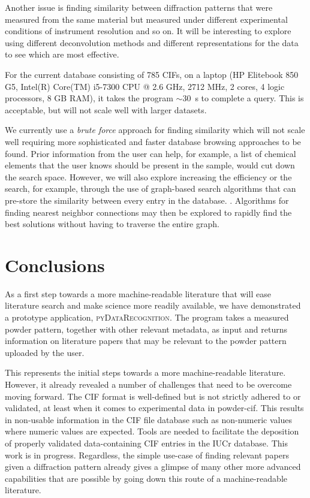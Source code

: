 \documentclass[preprint]{iucr}
\newcommand{\pydr}{\textsc{pyDataRecognition}\xspace}
\begin{document}
Another issue is finding similarity between diffraction patterns that were measured from the same material but measured under different experimental conditions of instrument resolution and so on.  It will be interesting to explore using different deconvolution methods and different representations for the data to see which are most effective.

For the current database consisting of 785 CIFs, on a laptop (HP Elitebook 850 G5, Intel(R) Core(TM) i5-7300 CPU @ 2.6 GHz, 2712 MHz, 2 cores, 4 logic processors, 8 GB RAM), it takes the program $\sim30$~s to complete a query.  This is acceptable, but will not scale well with larger datasets.

We currently use a  \textit{brute force} approach for finding similarity which will not scale well requiring more sophisticated and faster database browsing approaches to be found.
Prior information from the user can help, for example, a list of chemical elements that the user knows should be present in the sample, would cut down the search space.  However, we will also explore increasing the efficiency or the search, for example, through the
use of graph-based search algorithms that can pre-store the similarity between every entry in the database. \cite{johnsonBillionScaleSimilaritySearch2021}. Algorithms for finding nearest neighbor connections may then be explored to rapidly find the best solutions without having to traverse the entire graph.

\section{Conclusions}

As a first step towards a more machine-readable literature that will ease literature search and make science more readily available, we have demonstrated a prototype application, \pydr. The program takes a measured powder pattern, together with other relevant metadata, as input and returns information on literature papers that may be relevant to the powder pattern uploaded by the user.

This represents the initial steps towards a more machine-readable literature.  However, it already revealed a number of challenges that need to be overcome moving forward. The CIF format is well-defined but is not strictly adhered to or validated, at least when it comes to experimental data in powder-cif.  This results in non-usable information in the CIF file database such as non-numeric values where numeric values are expected. Tools are needed to facilitate the deposition of properly validated data-containing CIF entries in the IUCr database.  This work is in progress. Regardless, the simple use-case of finding relevant papers given a diffraction pattern already gives a glimpse of many other more advanced capabilities that are possible by going down this route of a machine-readable literature.
\end{document}
